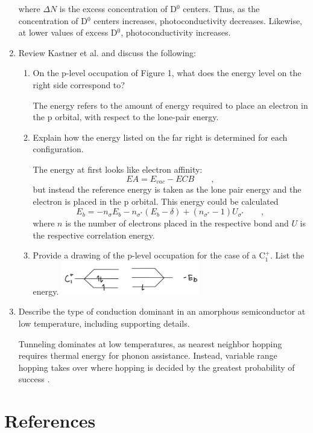 \documentclass[12pt]{elsarticle}
\newcommand{\vs}{\vspace{2mm}}
\begin{document}
\begin{enumerate}
where $\Delta N$ is the excess concentration of D$^{0}$ centers. Thus, as the concentration of D$^{0}$ centers increases, photoconductivity decreases. Likewise, at lower values of excess D$^{0}$, photoconductivity increases.
\vs
\item Review Kastner et al. \cite{Kastner} and discuss the following:
	\begin{enumerate}
		\item On the p-level occupation of Figure 1, what does the energy level on the right side correspond to?
		\par \vs
		The energy refers to the amount of energy required to place an electron in the p orbital, with respect to the lone-pair energy.
		\vs 
		\item Explain how the energy listed on the far right is determined for each configuration. 
		\par \vs 
		The energy at first looks like electron affinity:
		\begin{equation}
		EA = E_{vac}-E{CB} \qquad ,
		\end{equation}
		but instead the reference energy is taken as the lone pair energy and the electron is placed in the p orbital. This energy could  be calculated
		\begin{equation}
		E_{b} = -n_{\sigma}E_{b} - n_{\sigma^{*}}(E_{b}-\delta)+(n_{\sigma^{*}}-1)U_{\sigma^{*}}  \qquad ,
		\end{equation}
		where $n$ is the number of electrons placed in the respective bond and $U$ is the respective correlation energy.
		\vs
		\item Provide a drawing of the p-level occupation for the case of a C$_{1}^{+}$. List the energy.
		\includegraphics[width=0.5\textwidth]{c}
	\end{enumerate}
\item Describe the type of conduction dominant in an amorphous semiconductor at low temperature, including supporting details.
\par \vs 
Tunneling dominates at low temperatures, as nearest neighbor hopping requires thermal energy for phonon assistance. Instead, variable range hopping takes over where hopping is decided by the greatest probability of success \cite{Yu2001}.
\end{enumerate}


\section*{References}


\end{document}
